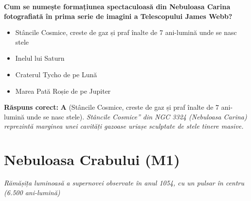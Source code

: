 \vspace{6pt}
\begin{tcolorbox}[orbitarquiz, title={\textbf{Întrebare de verificare \#67: Nebuloasa Carina (\quotedblbase{}Stâncile Cosmice\textquotedblright{}, NGC 3372)}}]
\textbf{Cum se numește formațiunea spectaculoasă din Nebuloasa Carina fotografiată în prima serie de imagini a Telescopului James Webb?}
\begin{itemize}[leftmargin=2.2em, itemsep=2pt, topsep=4pt]
  \item[$\square$ \textbf{A.}] Stâncile Cosmice, creste de gaz și praf înalte de 7 ani-lumină unde se nasc stele
  \item[$\square$ \textbf{B.}] Inelul lui Saturn
  \item[$\square$ \textbf{C.}] Craterul Tycho de pe Lună
  \item[$\square$ \textbf{D.}] Marea Pată Roșie de pe Jupiter
\end{itemize}
\vspace{2pt}
{\footnotesize\color{orbitarMuted}\textbf{Răspuns corect:} \textbf{A} (Stâncile Cosmice, creste de gaz și praf înalte de 7 ani-lumină unde se nasc stele). \emph{\quotedblbase{}Stâncile Cosmice\textquotedblright{} din NGC 3324 (Nebuloasa Carina) reprezintă marginea unei cavități gazoase uriașe sculptate de stele tinere masive.}}
\end{tcolorbox}
\clearpage


\section{Nebuloasa Crabului (M1)}
\label{sec:body-crab_nebula}
\vspace{-4pt}
{\large\itshape\color{orbitarAccent} Rămășița luminoasă a supernovei observate în anul 1054, cu un pulsar în centru (6.500 ani-lumină)}\\[4pt]



